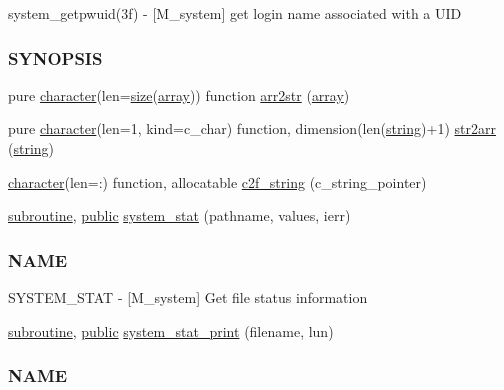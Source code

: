 \begin{DoxyCompactItemize}
\begin{DoxyCompactList}
system\+\_\+getpwuid(3f) -\/ \mbox{[}M\+\_\+system\mbox{]} get login name associated with a U\+ID \subsubsection*{S\+Y\+N\+O\+P\+S\+IS}\end{DoxyCompactList}\item 
pure \hyperlink{option__stopwatch_83_8txt_abd4b21fbbd175834027b5224bfe97e66}{character}(len=\hyperlink{what__overview_81_8txt_ab5692ed87074f1d5ec850a9ffa8b5af9}{size}(\hyperlink{intro__blas1_83_8txt_a89db1945e1a335ab0184c6a097821e32}{array})) function \hyperlink{namespacem__system_aeb3d7d4cb39d59917910a3ae2532206d}{arr2str} (\hyperlink{intro__blas1_83_8txt_a89db1945e1a335ab0184c6a097821e32}{array})
\item 
pure \hyperlink{option__stopwatch_83_8txt_abd4b21fbbd175834027b5224bfe97e66}{character}(len=1, kind=c\+\_\+char) function, dimension(len(\hyperlink{what__overview_81_8txt_a74cb7e955273b9f9157b4f0c18a38849}{string})+1) \hyperlink{namespacem__system_af7e778ffc24aa7bc00b842a8e673aeaa}{str2arr} (\hyperlink{what__overview_81_8txt_a74cb7e955273b9f9157b4f0c18a38849}{string})
\item 
\hyperlink{option__stopwatch_83_8txt_abd4b21fbbd175834027b5224bfe97e66}{character}(len=\+:) function, allocatable \hyperlink{namespacem__system_aa7c5445619aa15cd2301fe17f7c3b73c}{c2f\+\_\+string} (c\+\_\+string\+\_\+pointer)
\item 
\hyperlink{M__stopwatch_83_8txt_acfbcff50169d691ff02d4a123ed70482}{subroutine}, \hyperlink{M__stopwatch_83_8txt_a2f74811300c361e53b430611a7d1769f}{public} \hyperlink{namespacem__system_a5bb1ebcebe181e07fd24e908cacc9887}{system\+\_\+stat} (pathname, values, ierr)
\begin{DoxyCompactList}\small\item\em \subsubsection*{N\+A\+ME}

S\+Y\+S\+T\+E\+M\+\_\+\+S\+T\+AT -\/ \mbox{[}M\+\_\+system\mbox{]} Get file status information \end{DoxyCompactList}\item 
\hyperlink{M__stopwatch_83_8txt_acfbcff50169d691ff02d4a123ed70482}{subroutine}, \hyperlink{M__stopwatch_83_8txt_a2f74811300c361e53b430611a7d1769f}{public} \hyperlink{namespacem__system_aa26c234da8b559f549db4dbe446b8acc}{system\+\_\+stat\+\_\+print} (filename, lun)
\begin{DoxyCompactList}\small\item\em \subsubsection*{N\+A\+ME}


\end{DoxyCompactList}
\end{DoxyCompactItemize}
